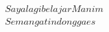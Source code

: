 \documentclass[preview]{standalone}
\begin{document}
\begin{align*}
Saya lagi belajar Manim\\ Semangatin dong gaes
\end{align*}
\end{document}
